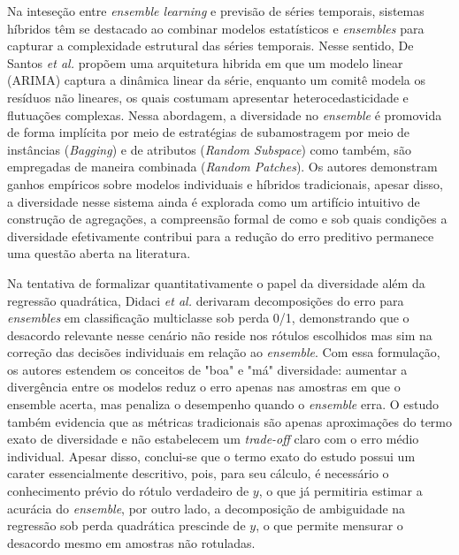 Na inteseção entre \textit{ensemble learning} e previsão de séries temporais, sistemas híbridos têm se destacado ao combinar modelos estatísticos e \textit{ensembles} para capturar a complexidade estrutural das séries temporais. Nesse sentido,  De Santos \textit{et al.} \cite{deo.santosjuniorIntelligentHybridizationARIMA2019} propõem uma arquitetura hibrida em que um modelo linear (ARIMA) captura a dinâmica linear da série, enquanto um comitê modela os resíduos não lineares, os quais costumam apresentar heterocedasticidade e flutuações complexas. Nessa abordagem, a diversidade no \textit{ensemble} é promovida de forma implícita por meio de estratégias de subamostragem por meio de instâncias (\textit{Bagging}) e de atributos (\textit{Random Subspace}) como também, são empregadas de maneira combinada (\textit{Random Patches}). Os autores demonstram ganhos empíricos sobre modelos individuais e híbridos tradicionais, apesar disso, a diversidade nesse sistema ainda é explorada como um artifício intuitivo de construção de agregações, a compreensão formal de como e sob quais condições a diversidade efetivamente contribui para a redução do erro preditivo permanece uma questão aberta na literatura.

Na tentativa de formalizar quantitativamente o papel da diversidade além da regressão quadrática, Didaci \textit{et al.} \cite{didaciDiversityClassifierEnsembles2013} derivaram decomposições do erro para \textit{ensembles} em classificação multiclasse sob perda 0/1, demonstrando que o desacordo relevante nesse cenário não reside nos rótulos escolhidos mas sim na correção das decisões individuais em relação ao \textit{ensemble}. Com essa formulação, os autores estendem os conceitos de "boa" e "má" diversidade: aumentar a divergência entre os modelos reduz o erro apenas nas amostras em que o ensemble acerta, mas penaliza o desempenho quando o \textit{ensemble} erra. O estudo também evidencia que as métricas tradicionais são apenas aproximações do termo exato de diversidade e não estabelecem um \textit{trade-off} claro com o erro médio individual. Apesar disso, conclui-se que o termo exato do estudo possui um carater essencialmente descritivo, pois, para seu cálculo, é necessário o conhecimento prévio do rótulo verdadeiro de $y$, o que já permitiria estimar a acurácia do \textit{ensemble}, por outro lado, a decomposição de ambiguidade na regressão sob perda quadrática prescinde de $y$, o que permite mensurar o desacordo mesmo em amostras não rotuladas.


